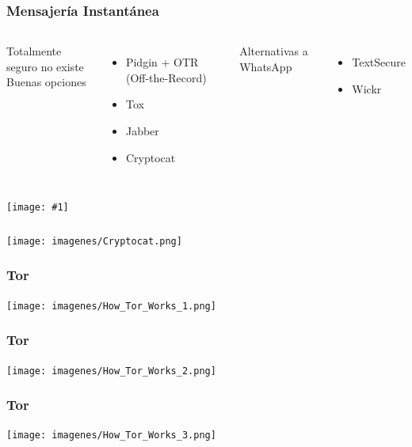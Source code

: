 \documentclass{beamer}
\newcommand{\fullframegraphic}[1]{
\begin{frame}[c]
    \texttt{[image: \#1]}
\end{frame}

}
\begin{document}
\begin{frame}
  \frametitle{Mensajería Instantánea}
  \begin{columns}
    \begin{center}
      Totalmente seguro no existe \\
      Buenas opciones
    \end{center}
    \begin{itemize}
      \item Pidgin + OTR (Off-the-Record)
      \item Tox
      \item Jabber\XMPP
      \item Cryptocat
    \end{itemize}
    \begin{center}
      Alternativas a WhatsApp
    \end{center}
    \begin{itemize}
      \item TextSecure
      \item Wickr
      \end{itemize}
      \end{columns}
\end{frame}

\fullframegraphic{imagenes/utox.png}

\begin{frame}
  \frametitle{}
  \texttt{[image: imagenes/Cryptocat.png]}
\end{frame}

\begin{frame}
  \frametitle{Tor}
  \texttt{[image: imagenes/How\_Tor\_Works\_1.png]} 
\end{frame}

\begin{frame}
  \frametitle{Tor}
  \texttt{[image: imagenes/How\_Tor\_Works\_2.png]}
\end{frame}

\begin{frame}
  \frametitle{Tor}
  \texttt{[image: imagenes/How\_Tor\_Works\_3.png]}
\end{frame}
\end{document}
